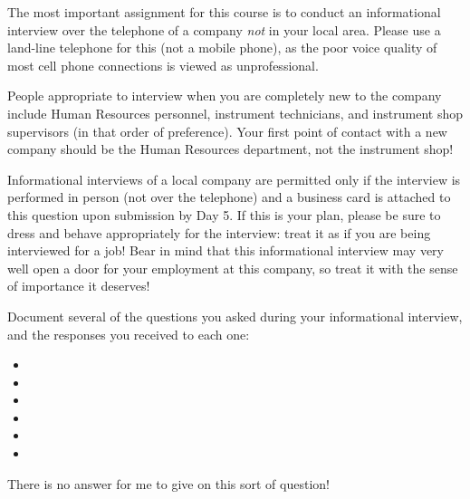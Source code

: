 

The most important assignment for this course is to conduct an informational interview over the telephone of a company {\it not} in your local area.  Please use a land-line telephone for this (not a mobile phone), as the poor voice quality of most cell phone connections is viewed as unprofessional.

People appropriate to interview when you are completely new to the company include Human Resources personnel, instrument technicians, and instrument shop supervisors (in that order of preference).  Your first point of contact with a new company should be the Human Resources department, not the instrument shop!

Informational interviews of a local company are permitted only if the interview is performed in person (not over the telephone) and a business card is attached to this question upon submission by Day 5.  If this is your plan, please be sure to dress and behave appropriately for the interview: treat it as if you are being interviewed for a job!  Bear in mind that this informational interview may very well open a door for your employment at this company, so treat it with the sense of importance it deserves!

\vskip 10pt

Document several of the questions you asked during your informational interview, and the responses you received to each one:

\vskip 10pt

\begin{itemize}
\item{} 
\vskip 60pt
\item{} 
\vskip 60pt
\item{} 
\vskip 60pt
\item{} 
\vskip 60pt
\item{} 
\vskip 60pt
\item{} 
\end{itemize}

\vfil

\eject






There is no answer for me to give on this sort of question!

